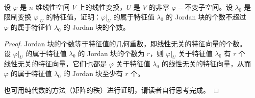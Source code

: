 \documentclass[../../main.tex]{subfiles}%
\begin{document}
\begin{proposition}\label{proposition:限制变换的任一Jordan块的个数一定小于原线性变换的特征值对应的Jordan块的个数}
设 \(\varphi\) 是 \(n\) 维线性空间 \(V\) 上的线性变换，\(U\) 是 \(V\) 的非零 \(\varphi -\)不变子空间。设 \(\lambda_0\) 是限制变换 \(\varphi|_U\) 的特征值，证明：\(\varphi|_U\) 的属于特征值 \(\lambda_0\) 的 Jordan 块的个数不超过 \(\varphi\) 的属于特征值 \(\lambda_0\) 的 Jordan 块的个数。
\end{proposition}
\begin{proof}

Jordan 块的个数等于特征值的几何重数，即线性无关的特征向量的个数。设 \(\varphi|_U\) 的属于特征值 \(\lambda_0\) 的 Jordan 块的个数为 \(r\)，则 \(\varphi|_U\) 关于特征值 \(\lambda_0\) 有 \(r\) 个线性无关的特征向量，它们也都是 \(\varphi\) 关于特征值 \(\lambda_0\) 的线性无关的特征向量，从而 \(\varphi\) 的属于特征值 \(\lambda_0\) 的 Jordan 块至少有 \(r\) 个。

也可用纯代数的方法（矩阵的秩）进行证明，请读者自行思考完成。

\end{proof}
\end{document}

